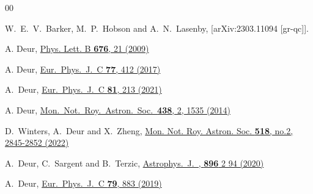 \documentclass[superscriptaddress,amsmath,amssymb,nofootinbib]{revtex4}
\begin{document}
\begin{thebibliography}{00}


W.~E.~V.~Barker, M.~P.~Hobson and A.~N.~Lasenby,
[arXiv:2303.11094 [gr-qc]].

A. Deur, 
\href{http://www.sciencedirect.com/science/article/pii/S0370269309004870}{Phys. Lett. B  {\bf 676}, 21 (2009)}

A. Deur,
\href{https://link.springer.com/article/10.1140\%2Fepjc\%2Fs10052-017-4971-x}{Eur.\ Phys.\ J.\ C  {\bf 77}, 412 (2017)}

A.~Deur,
\href{https://doi.org/10.1140/epjc/s10052-021-08965-5}{Eur.\ Phys.\ J.\ C   {\bf 81},   213   (2021)}

A. Deur, 
\href{https://academic.oup.com/mnras/article-lookup/doi/10.1093/mnras/stt2293}{Mon.\ Not.\ Roy.\ Astron.\ Soc.\  {\bf 438}, 2, 1535 (2014)} 

D.~Winters, A.~Deur and X.~Zheng,
\href{https://doi.org/10.48550/arXiv.2207.02945}{Mon. Not. Roy. Astron. Soc. \textbf{518}, no.2, 2845-2852 (2022)}


  A.~Deur, C.~Sargent and B.~Terzic,
\href{https://doi.org/10.3847%2F1538-4357%2Fab94b6}{Astrophys.\ J.\ ,  {\bf 896}  2 94 (2020)}


A.~Deur,
\href{https://doi.org/10.1140/epjc/s10052-019-7393-0}{Eur.\ Phys.\ J.\ C {\bf 79}, 883 (2019)}



\end{thebibliography}
\end{document}
